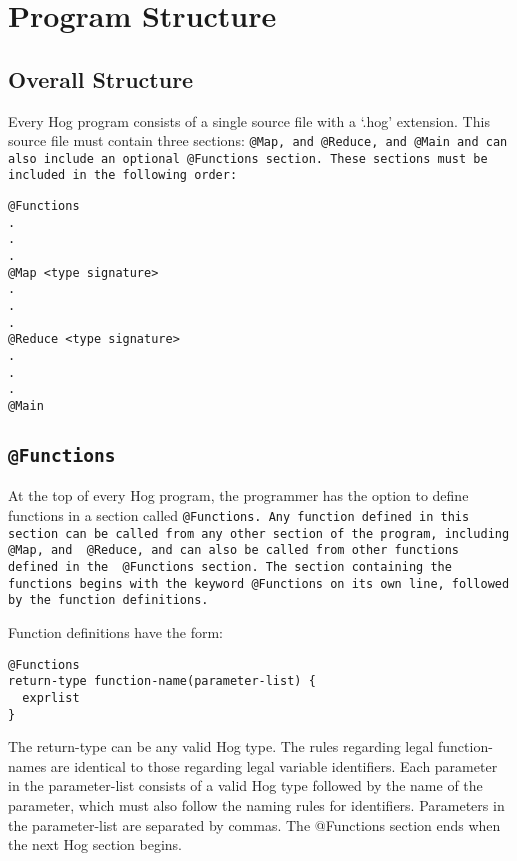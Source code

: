 \documentclass{book}
\begin{document}

\chapter{Program Structure} %
\label{cha:program_structure}

\section{Overall Structure} %
\label{sec:overall_structure}

Every Hog program consists of a single source file with a ‘.hog’ extension. This
source file must contain three sections: \tt @Map\rm, and \tt @Reduce\rm, and
\tt @Main \rm and can also include an optional \tt @Functions \rm section. These
sections must be included in the following order:

\begin{verbatim}
@Functions 
.
.
.
@Map <type signature>
.
.
.
@Reduce <type signature>
.
.
.
@Main
\end{verbatim}


\section{\tt @Functions\rm} %
\label{sec:tt_functionsrm}

At the top of every Hog program, the programmer has the option to define functions
in a section called \tt @Functions\rm. Any function defined in this section can be
called from any other section of the program, including \tt @Map\rm, and \tt
@Reduce\rm, and can also be called from other functions defined in the \tt
@Functions \rm section. The section containing the functions begins with the
keyword \tt @Functions \rm on its own line, followed by the function definitions.

Function definitions have the form:

\begin{verbatim}
@Functions
return-type function-name(parameter-list) {
  exprlist
}
\end{verbatim}

The return-type can be any valid Hog type. The rules regarding legal function-names
are identical to those regarding legal variable identifiers. Each parameter in the
parameter-list consists of a valid Hog type followed by the name of the parameter,
which must also follow the naming rules for identifiers. Parameters in the
parameter-list are separated by commas. The @Functions section ends when the next
Hog section begins.
\end{document}

